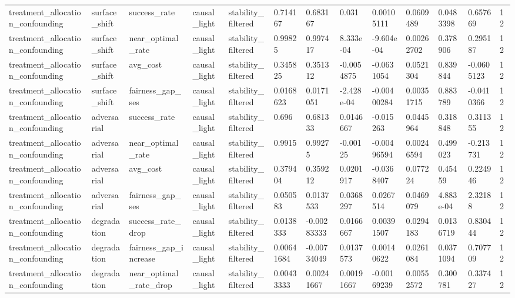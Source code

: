 \begin{tabular}{lllllllllllll}
treatment\_allocation\_confounding & surface\_shift & success\_rate & causal\_light & stability\_filtered & 0.714167 & 0.683167 & 0.031 & 0.00105111 & 0.0609489 & 0.0483398 & 0.657669 & 12 \\
treatment\_allocation\_confounding & surface\_shift & near\_optimal\_rate & causal\_light & stability\_filtered & 0.99825 & 0.997417 & 8.333e-04 & -9.604e-04 & 0.00262702 & 0.378906 & 0.295187 & 12 \\
treatment\_allocation\_confounding & surface\_shift & avg\_cost & causal\_light & stability\_filtered & 0.345825 & 0.351312 & -0.0054875 & -0.0631054 & 0.0521304 & 0.839844 & -0.0605123 & 12 \\
treatment\_allocation\_confounding & surface\_shift & fairness\_gap\_ses & causal\_light & stability\_filtered & 0.0168623 & 0.0171051 & -2.428e-04 & -0.00400284 & 0.00351715 & 0.883789 & -0.0410366 & 12 \\
treatment\_allocation\_confounding & adversarial & success\_rate & causal\_light & stability\_filtered & 0.696 & 0.681333 & 0.0146667 & -0.015263 & 0.0445964 & 0.318848 & 0.311355 & 12 \\
treatment\_allocation\_confounding & adversarial & near\_optimal\_rate & causal\_light & stability\_filtered & 0.9915 & 0.99275 & -0.00125 & -0.00496594 & 0.00246594 & 0.499023 & -0.213731 & 12 \\
treatment\_allocation\_confounding & adversarial & avg\_cost & causal\_light & stability\_filtered & 0.379404 & 0.359212 & 0.0201917 & -0.0368407 & 0.077224 & 0.45459 & 0.224946 & 12 \\
treatment\_allocation\_confounding & adversarial & fairness\_gap\_ses & causal\_light & stability\_filtered & 0.050583 & 0.0137533 & 0.0368297 & 0.0267514 & 0.0469079 & 4.883e-04 & 2.32188 & 12 \\
treatment\_allocation\_confounding & degradation & success\_rate\_drop & causal\_light & stability\_filtered & 0.0138333 & -0.00283333 & 0.0166667 & 0.00391507 & 0.0294183 & 0.0136719 & 0.830444 & 12 \\
treatment\_allocation\_confounding & degradation & fairness\_gap\_increase & causal\_light & stability\_filtered & 0.00641684 & -0.00734049 & 0.0137573 & 0.00140622 & 0.0261084 & 0.0371094 & 0.707709 & 12 \\
treatment\_allocation\_confounding & degradation & near\_optimal\_rate\_drop & causal\_light & stability\_filtered & 0.00433333 & 0.00241667 & 0.00191667 & -0.00169239 & 0.00552572 & 0.300781 & 0.337427 & 12 \\

\end{tabular}
